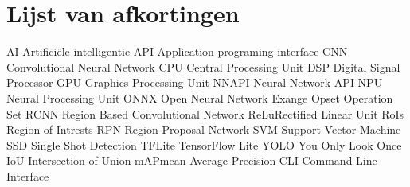 \chapter*{Lijst van afkortingen}
AI \> \> \qquad Artifici\"ele intelligentie \newline
API \> \qquad  Application programing interface \newline
CNN \qquad   Convolutional Neural Network \newline
CPU \qquad   Central Processing Unit \newline
DSP \qquad   Digital Signal Processor \newline
GPU \qquad   Graphics Processing Unit \newline
NNAPI \>\>\>\> Neural Network API \newline
NPU \qquad   Neural Processing Unit \newline
ONNX \>\>\>\>  Open Neural Network Exange \newline
Opset \>\> \>\> Operation Set \newline
RCNN \>\>\>\>  Region Based Convolutional Network \newline
ReLu\qquad  Rectified Linear Unit \newline
RoIs \>\>\> \> \> Region of Intrests \newline
RPN \qquad   Region Proposal Network \newline
SVM \qquad   Support Vector Machine \newline
SSD \qquad   Single Shot Detection \newline
TFLite \>\> \> TensorFlow Lite \newline
YOLO \>\>\>\> You Only Look Once \newline
IoU \> \qquad   Intersection of Union \newline
mAP\qquad   mean Average Precision \newline
CLI \> \qquad   Command Line Interface